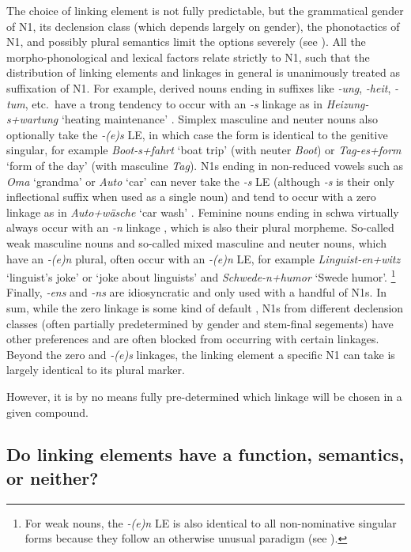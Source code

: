The choice of linking element is not fully predictable, but the grammatical gender of N1, its declension class (which depends largely on gender), the phonotactics of N1, and possibly plural semantics limit the options severely (see \citealt{Fuhrhop1996,NueblingSzczepaniak2013}).
All the morpho-phonological and lexical factors relate strictly to N1, such that the distribution of linking elements and linkages in general is unanimously treated as suffixation of N1.
For example, derived nouns ending in suffixes like \textit{-ung}, \textit{-heit}, \textit{-tum}, etc.\ have a trong tendency to occur with an \textit{-s} linkage as in \textit{Heizung-s+wartung} `heating maintenance' \parencite{?WHOM?}.
Simplex masculine and neuter nouns also optionally take the \textit{-(e)s} LE, in which case the form is identical to the genitive singular, for example \textit{Boot-s+fahrt} `boat trip' (with neuter \textit{Boot}) or \textit{Tag-es+form} `form of the day' (with masculine \textit{Tag}).
N1s ending in non-reduced vowels such as \textit{Oma} `grandma' or \textit{Auto} `car' can never take the \textit{-s} LE (although \textit{-s} is their only inflectional suffix when used as a single noun) and tend to occur with a zero linkage as in \textit{Auto+wäsche} `car wash' \parencite{?WHOM?}.
Feminine nouns ending in schwa virtually always occur with an \textit{-n} linkage \parencite[32]{LibbenEa2002}, which is also their plural morpheme.
So-called weak masculine nouns and so-called mixed masculine and neuter nouns, which have an \textit{-(e)n} plural, often occur with an \textit{-(e)n} LE, for example \textit{Linguist-en+witz} `linguist's joke' or `joke about linguists' and \textit{Schwede-n+humor} `Swede humor'.%
\footnote{For weak nouns, the \textit{-(e)n} LE is also identical to all non-nominative singular forms because they follow an otherwise unusual paradigm (see \citealt{Koepcke1995,Schaefer2016c}).}
Finally, \textit{-ens} and \textit{-ns} are idiosyncratic and only used with a handful of N1s.
In sum, while the zero linkage is some kind of default \parencite[30]{Neef2015}, N1s from different declension classes (often partially predetermined by gender and stem-final segements) have other preferences and are often blocked from occurring with certain linkages.
Beyond the zero and \textit{-(e)s} linkages, the linking element a specific N1 can take is largely identical to its plural marker.

However, it is by no means fully pre-determined which linkage will be chosen in a given compound.


\subsection{Do linking elements have a function, semantics, or neither?}
\label{sub:dolinkingelementshaveafunctionsemanticsorneither}

